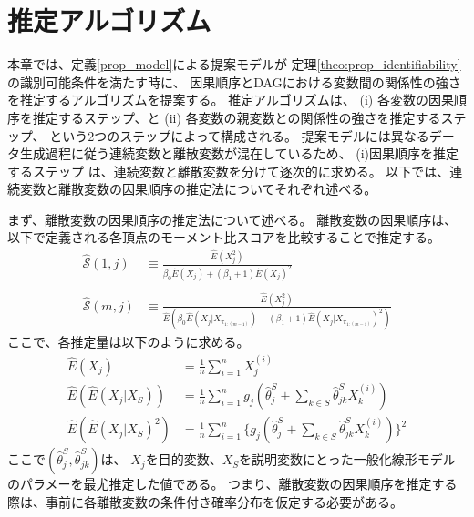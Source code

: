 
\section{推定アルゴリズム}
\label{part:algorithm}

本章では、定義\ref{prop_model}による提案モデルが
定理\ref{theo:prop_identifiability}の識別可能条件を満たす時に、
因果順序とDAGにおける変数間の関係性の強さを推定するアルゴリズムを提案する。
推定アルゴリズムは、
(i) 各変数の因果順序を推定するステップ、と
(ii) 各変数の親変数との関係性の強さを推定するステップ、
という2つのステップによって構成される。
提案モデルには異なるデータ生成過程に従う連続変数と離散変数が混在しているため、
(i)因果順序を推定するステップ は、連続変数と離散変数を分けて逐次的に求める。
以下では、連続変数と離散変数の因果順序の推定法についてそれぞれ述べる。

まず、離散変数の因果順序の推定法について述べる。
離散変数の因果順序は、以下で定義される各頂点のモーメント比スコアを比較することで推定する。
\begin{equation}
  \begin{split}
    \widehat{\mathcal S}(1,j) &\equiv
          \frac{\widehat{E}(X_j^2)}{\beta_0 \widehat{E}(X_j) + (\beta_1 + 1)\widehat{E}(X_j)^2} \\
          \\
    \widehat{\mathcal S}(m,j) &\equiv
          \frac{\widehat{E}(X_j^2)}
          {\widehat{E}(\beta_0 \widehat{E}(X_j | X_{\widehat{\pi}_{1:(m-1)}}) +
          (\beta_1 + 1)\widehat{E}(X_j | X_{\widehat{\pi}_{1:(m-1)}})^2)}
  \end{split}
  \label{alg:MRS}
\end{equation}
ここで、各推定量は以下のように求める。
\begin{align*}
  \widehat{E}(X_j)
      &= \tfrac{1}{n}\textstyle \sum_{i=1}^n X_j^{(i)} \\
  \widehat{E}(\widehat{E}(X_j | X_S))
      &= \tfrac{1}{n}\textstyle \sum_{i=1}^n g_j(\widehat{\theta}_j^S +
         \textstyle \sum_{k\in S} \widehat{\theta}_{jk}^S X_k^{(i)}) \\
  \widehat{E}(\widehat{E}(X_j | X_S)^2)
      &= \tfrac{1}{n}\textstyle \sum_{i=1}^n \{g_j(\widehat{\theta}_j^S +
         \textstyle \sum_{k\in S} \widehat{\theta}_{jk}^S X_k^{(i)})\}^2
\end{align*}
ここで$(\widehat{\theta}_j^S, \widehat{\theta}_{jk}^S)$は、
$X_j$を目的変数、$X_S$を説明変数にとった一般化線形モデルのパラメーを最尤推定した値である。
つまり、離散変数の因果順序を推定する際は、事前に各離散変数の条件付き確率分布を仮定する必要がある。


